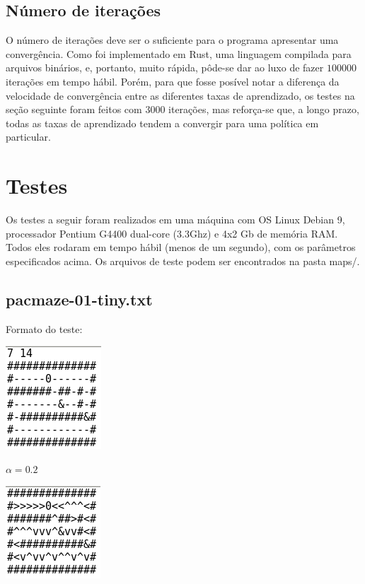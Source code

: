 \documentclass[11pt]{article}
\begin{document}
\subsection{Número de iterações}

O número de iterações deve ser o suficiente para o programa apresentar uma convergência. Como foi implementado em Rust, uma linguagem compilada para arquivos binários, e, portanto, muito rápida, pôde-se dar ao luxo de fazer $100000$ iterações em tempo hábil. Porém, para que fosse posível notar a diferença da velocidade de convergência entre as diferentes taxas de aprendizado, os testes na seção seguinte foram feitos com $3000$ iterações, mas reforça-se que, a longo prazo, todas as taxas de aprendizado tendem a convergir para uma política em particular.

\section{Testes}

Os testes a seguir foram realizados em uma máquina com OS Linux Debian 9, processador Pentium G4400 dual-core (3.3Ghz) e 4x2 Gb de memória RAM. Todos eles rodaram em tempo hábil (menos de um segundo), com os parâmetros especificados acima. Os arquivos de teste podem ser encontrados na pasta maps/.

\subsection{pacmaze-01-tiny.txt}

Formato do teste:

\includegraphics[scale=.5]{tst1map.png}

$\alpha = 0.2$

\includegraphics[scale=.5]{tst1-02.png}
\end{document}

